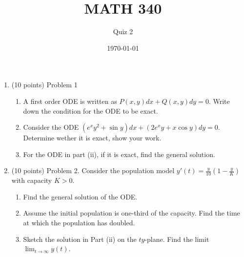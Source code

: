 \documentclass{article}
\begin{document}
\title{MATH 340}
\author{Quiz 2}
\date{\today}
\maketitle

\begin{enumerate}
	\item (10 points) Problem 1
		\begin{enumerate}
			\item A first order ODE is written as
				$P(x,y)dx+Q(x,y)dy=0$. Write down the condition
				for the ODE to be exact.
			\item Consider the ODE $(e^xy^2+\sin y)dx+(2e^xy+x\cos
				y)dy=0$. Determine wether it is exact, show
				your work.
			\item For the ODE in part (ii), if it is exact, find the general solution.
		\end{enumerate}
	\item (10 points) Problem 2. Consider the population model
		$y'(t)=\frac{y}{10}\left(1-\frac{y}{K}\right)$ with capacity $K>0$.
		\begin{enumerate}
			\item Find the general solution of the ODE.
			\item Assume the initial population is one-third of the
				capacity. Find the time at which the population
				has doubled.
			\item Sketch the solution in Part (ii) on the $ty$-plane. Find the limit $\lim_{t\to\infty}y(t)$.
		\end{enumerate}
\end{enumerate}
\end{document}
